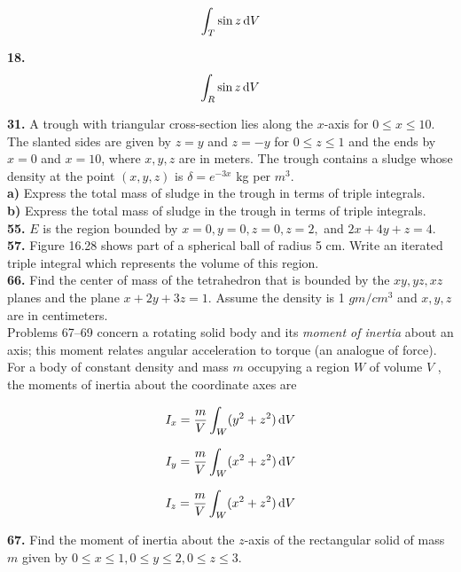 \documentclass[a4paper,12pt]{article}
\begin{document}
\[ \int _T \sin{z} \, \text dV \]

\textbf{18.} \\

\[ \int _R \sin{z} \, \text dV \]

\textbf{31.} A trough with triangular cross-section lies along the $x$-axis for
$0 \leq x \leq 10$. The slanted sides are given by $z = y$ and $z = -y$ for
$0 \leq z \leq 1$ and the ends by $x = 0$ and $x = 10$, where $x, y, z$ are in meters.
The trough contains a sludge whose density at the point $(x, y, z)$ is
$\delta = e^{-3x}$ kg per $m^3$. \\

\textbf{a)} Express the total mass of sludge in the trough in terms of triple
integrals. \\

\textbf{b)} Express the total mass of sludge in the trough in terms of triple
integrals. \\

\textbf{55.} $E$ is the region bounded by $x = 0, y = 0, z = 0, z = 2,$
and $2x + 4y + z = 4$. \\

\textbf{57.} Figure 16.28 shows part of a spherical ball of radius 5 cm.
Write an iterated triple integral which represents the volume of this region. \\

\textbf{66.} Find the center of mass of the tetrahedron that is bounded by the
$xy, yz, xz$ planes and the plane $x + 2y + 3z = 1$. Assume the density is
1 $gm/cm^3$ and $x, y, z$ are in centimeters. \\

Problems 67–69 concern a rotating solid body and its \textit{moment of inertia}
about an axis; this moment relates angular acceleration to torque (an analogue
of force). For a body of constant density and mass $m$ occupying a region $W$
of volume $V$ , the moments of inertia about the coordinate axes are

\[I_x = \frac{m}{V} \int _W (y^2 + z^2) \, \text d V \]

\[I_y = \frac{m}{V} \int _W (x^2 + z^2) \, \text d V \]

\[I_z = \frac{m}{V} \int _W (x^2 + z^2) \, \text d V \]

\textbf{67.} Find the moment of inertia about the $z$-axis of the rectangular
solid of mass $m$ given by $0 \leq x \leq 1, 0 \leq y \leq 2, 0 \leq z \leq 3$. \\
\end{document}
